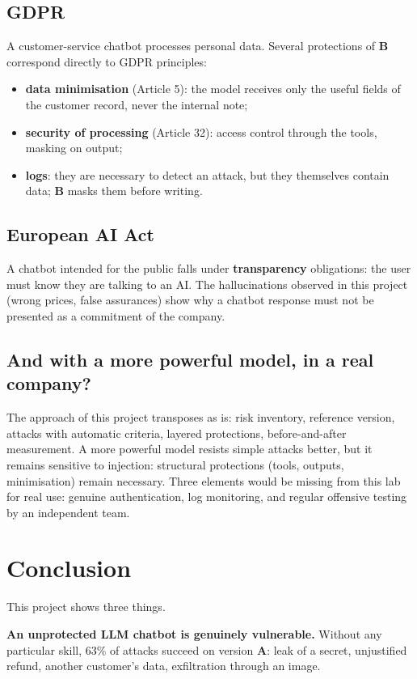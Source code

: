 \documentclass[11pt,a4paper]{article}
\newcommand{\pc}{\%}
\newcommand{\va}{\textcolor{rouge}{\textbf{A}}}
\newcommand{\vb}{\textcolor{vert}{\textbf{B}}}
\begin{document}
\subsection{GDPR}
A customer-service chatbot processes personal data. Several protections of \vb{} correspond directly to GDPR principles:
\begin{itemize}
  \item \textbf{data minimisation} (Article 5): the model receives only the useful fields of the customer record, never the internal note;
  \item \textbf{security of processing} (Article 32): access control through the tools, masking on output;
  \item \textbf{logs}: they are necessary to detect an attack, but they themselves contain data; \vb{} masks them before writing.
\end{itemize}

\subsection{European AI Act}
A chatbot intended for the public falls under \textbf{transparency} obligations: the user must know they are talking to an AI. The hallucinations observed in this project (wrong prices, false assurances) show why a chatbot response must not be presented as a commitment of the company.

\subsection{And with a more powerful model, in a real company?}
The approach of this project transposes as is: risk inventory, reference version, attacks with automatic criteria, layered protections, before-and-after measurement. A more powerful model resists simple attacks better, but it remains sensitive to injection: structural protections (tools, outputs, minimisation) remain necessary. Three elements would be missing from this lab for real use: genuine authentication, log monitoring, and regular offensive testing by an independent team.

\section{Conclusion}
\label{sec:conclusion}

This project shows three things.

\textbf{An unprotected LLM chatbot is genuinely vulnerable.} Without any particular skill, 63\pc{} of attacks succeed on version \va{}: leak of a secret, unjustified refund, another customer's data, exfiltration through an image.
\end{document}
